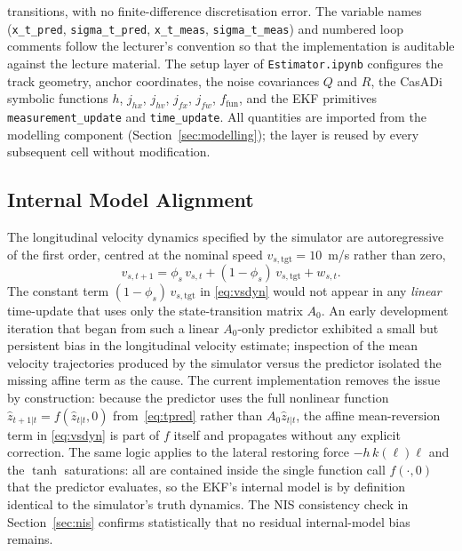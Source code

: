 \documentclass[11pt,a4paper]{article}
\newcommand{\code}[1]{\texttt{#1}}
\begin{document}
transitions, with no finite-difference discretisation error.
The variable names (\code{x\_t\_pred}, \code{sigma\_t\_pred},
\code{x\_t\_meas}, \code{sigma\_t\_meas}) and numbered loop comments
follow the lecturer's convention so that the implementation is
auditable against the lecture material. The setup layer of
\code{Estimator.ipynb} configures the track geometry, anchor
coordinates, the noise covariances $Q$ and $R$, the CasADi symbolic
functions $h$, $j_{hx}$, $j_{hv}$, $j_{fx}$, $j_{fw}$, $f_{\mathrm{
fun}}$, and the EKF primitives \code{measurement\_update} and
\code{time\_update}. All quantities are imported from the modelling
component (Section~\ref{sec:modelling}); the layer is reused by every
subsequent cell without modification.

\subsection{Internal Model Alignment}
\label{sec:internal-model}

The longitudinal velocity dynamics specified by the simulator are
autoregressive of the first order, centred at the nominal speed
$v_{s,\mathrm{tgt}}=10$~m/s rather than zero,
\begin{equation}
v_{s,t+1}=\phi_s\,v_{s,t}+(1-\phi_s)\,v_{s,\mathrm{tgt}}+w_{s,t}.
\label{eq:vsdyn}
\end{equation}
The constant term $(1-\phi_s)\,v_{s,\mathrm{tgt}}$ in
\eqref{eq:vsdyn} would not appear in any \emph{linear} time-update
that uses only the state-transition matrix $A_0$. An early development
iteration that began from such a linear $A_0$-only predictor exhibited
a small but persistent bias in the longitudinal velocity estimate;
inspection of the mean velocity trajectories produced by the simulator
versus the predictor isolated the missing affine term as the cause.
The current implementation removes the issue by construction:
because the predictor uses the full nonlinear function
$\hat{z}_{t+1|t}=f(\hat{z}_{t|t},0)$ from~\eqref{eq:tpred} rather than
$A_0\hat{z}_{t|t}$, the affine mean-reversion term in
\eqref{eq:vsdyn} is part of $f$ itself and propagates without any
explicit correction. The same logic applies to the lateral
restoring force $-h\,k(\ell)\ell$ and the $\tanh$ saturations: all are
contained inside the single function call $f(\cdot,0)$ that the
predictor evaluates, so the EKF's internal model is by definition
identical to the simulator's truth dynamics. The NIS consistency
check in Section~\ref{sec:nis} confirms statistically that no residual
internal-model bias remains.
\end{document}
